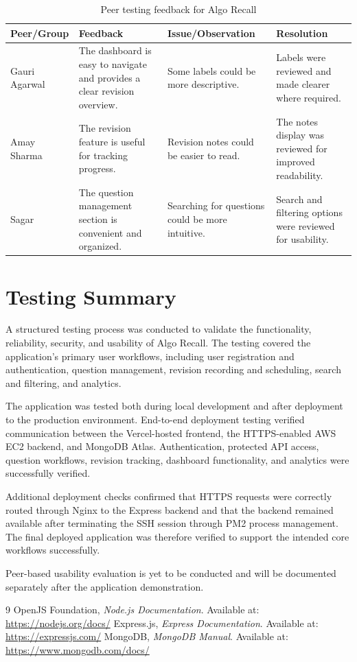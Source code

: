 \documentclass[12pt,a4paper]{report}
\begin{document}
\begin{table}[H]
\centering
\renewcommand{\arraystretch}{1.3}
\begin{tabular}{|p{2.5cm}|p{3.5cm}|p{3.5cm}|p{3.5cm}|}
\hline
\textbf{Peer/Group} & \textbf{Feedback} & \textbf{Issue/Observation} & \textbf{Resolution} \\
\hline
Gauri Agarwal & The dashboard is easy to navigate and provides a clear revision overview. & Some labels could be more descriptive. & Labels were reviewed and made clearer where required. \\
\hline
Amay Sharma & The revision feature is useful for tracking progress. & Revision notes could be easier to read. & The notes display was reviewed for improved readability. \\
\hline
Sagar & The question management section is convenient and organized. & Searching for questions could be more intuitive. & Search and filtering options were reviewed for usability. \\
\hline
\end{tabular}
\caption{Peer testing feedback for Algo Recall}
\end{table}

\section{Testing Summary}
A structured testing process was conducted to validate the functionality, reliability, security, and usability of Algo Recall. The testing covered the application's primary user workflows, including user registration and authentication, question management, revision recording and scheduling, search and filtering, and analytics.

The application was tested both during local development and after deployment to the production environment. End-to-end deployment testing verified communication between the Vercel-hosted frontend, the HTTPS-enabled AWS EC2 backend, and MongoDB Atlas. Authentication, protected API access, question workflows, revision tracking, dashboard functionality, and analytics were successfully verified.

Additional deployment checks confirmed that HTTPS requests were correctly routed through Nginx to the Express backend and that the backend remained available after terminating the SSH session through PM2 process management. The final deployed application was therefore verified to support the intended core workflows successfully.

Peer-based usability evaluation is yet to be conducted and will be documented separately after the application demonstration.

\begin{thebibliography}{9}
 OpenJS Foundation, \textit{Node.js Documentation}. Available at:
\url{https://nodejs.org/docs/}
 Express.js, \textit{Express Documentation}. Available at:
\url{https://expressjs.com/}
 MongoDB, \textit{MongoDB Manual}. Available at:
\url{https://www.mongodb.com/docs/}
\end{thebibliography}
\end{document}
